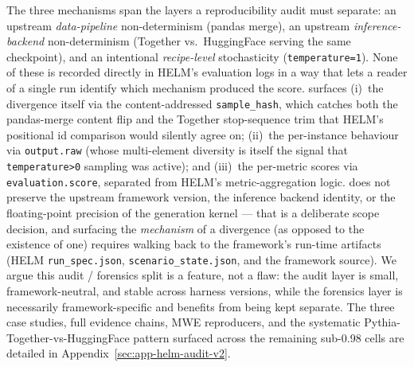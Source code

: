 The three mechanisms span the layers a reproducibility audit must separate: an
  upstream \emph{data-pipeline} non-determinism (pandas merge), an upstream
  \emph{inference-backend} non-determinism (Together vs.\ HuggingFace serving
  the same checkpoint), and an intentional \emph{recipe-level} stochasticity
  (\texttt{temperature=1}).
None of these is recorded directly in HELM's evaluation logs in a way that lets
  a reader of a single run identify which mechanism produced the score.
\eee{} surfaces (i)~the divergence itself via the content-addressed
  \texttt{sample\_hash}, which catches both the pandas-merge content flip and
  the Together stop-sequence trim that HELM's positional id comparison would
  silently agree on; (ii)~the per-instance behaviour via \texttt{output.raw}
  (whose multi-element diversity is itself the signal that
  \texttt{temperature>0} sampling was active); and (iii)~the per-metric scores
  via \texttt{evaluation.score}, separated from HELM's metric-aggregation logic.
\eee{} does not preserve the upstream framework version, the inference backend
  identity, or the floating-point precision of the generation kernel — that is a
  deliberate scope decision, and surfacing the \emph{mechanism} of a divergence
  (as opposed to the existence of one) requires walking back to the framework's
  run-time artifacts (HELM \texttt{run\_spec.json},
  \texttt{scenario\_state.json}, and the framework source).
We argue this audit / forensics split is a feature, not a flaw: the audit layer
  is small, framework-neutral, and stable across harness versions, while the
  forensics layer is necessarily framework-specific and benefits from being kept
  separate.
The three case studies, full evidence chains, MWE reproducers, and the
  systematic Pythia-Together-vs-HuggingFace pattern surfaced across the
  remaining sub-0.98 cells are detailed in
  Appendix~\ref{sec:app-helm-audit-v2}.
